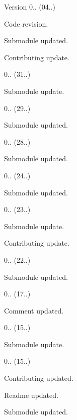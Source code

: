 \begin{DoxyVersion}{Version}
0.. (04..)
\begin{DoxyItemize}
\item Code revision.
\item Submodule updated.
\item Contributing update. 
\end{DoxyItemize}

0.. (31..)
\begin{DoxyItemize}
\item Submodule update. 
\end{DoxyItemize}

0.. (29..)
\begin{DoxyItemize}
\item Submodule updated. 
\end{DoxyItemize}

0.. (28..)
\begin{DoxyItemize}
\item Submodule updated. 
\end{DoxyItemize}

0.. (24..)
\begin{DoxyItemize}
\item Submodule updated. 
\end{DoxyItemize}

0.. (23..)
\begin{DoxyItemize}
\item Submodule update.
\item Contributing update. 
\end{DoxyItemize}

0.. (22..)
\begin{DoxyItemize}
\item Submodule updated. 
\end{DoxyItemize}

0.. (17..)
\begin{DoxyItemize}
\item Comment updated. 
\end{DoxyItemize}

0.. (15..)
\begin{DoxyItemize}
\item Submodule update. 
\end{DoxyItemize}

0.. (15..)
\begin{DoxyItemize}
\item Contributing updated.
\item Readme updated.
\item Submodule updated. 
\end{DoxyItemize}


\end{DoxyVersion}
